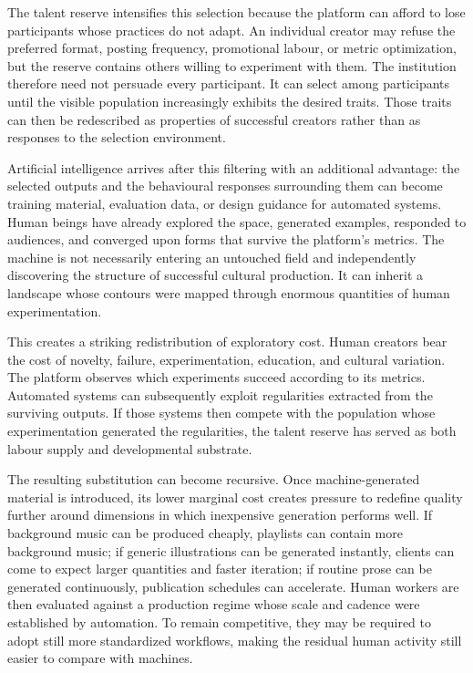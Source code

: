 \documentclass[11pt]{article}
\begin{document}
The talent reserve intensifies this selection because the platform can afford to lose participants whose practices do not adapt. An individual creator may refuse the preferred format, posting frequency, promotional labour, or metric optimization, but the reserve contains others willing to experiment with them. The institution therefore need not persuade every participant. It can select among participants until the visible population increasingly exhibits the desired traits. Those traits can then be redescribed as properties of successful creators rather than as responses to the selection environment.

Artificial intelligence arrives after this filtering with an additional advantage: the selected outputs and the behavioural responses surrounding them can become training material, evaluation data, or design guidance for automated systems. Human beings have already explored the space, generated examples, responded to audiences, and converged upon forms that survive the platform's metrics. The machine is not necessarily entering an untouched field and independently discovering the structure of successful cultural production. It can inherit a landscape whose contours were mapped through enormous quantities of human experimentation.

This creates a striking redistribution of exploratory cost. Human creators bear the cost of novelty, failure, experimentation, education, and cultural variation. The platform observes which experiments succeed according to its metrics. Automated systems can subsequently exploit regularities extracted from the surviving outputs. If those systems then compete with the population whose experimentation generated the regularities, the talent reserve has served as both labour supply and developmental substrate.

The resulting substitution can become recursive. Once machine-generated material is introduced, its lower marginal cost creates pressure to redefine quality further around dimensions in which inexpensive generation performs well. If background music can be produced cheaply, playlists can contain more background music; if generic illustrations can be generated instantly, clients can come to expect larger quantities and faster iteration; if routine prose can be generated continuously, publication schedules can accelerate. Human workers are then evaluated against a production regime whose scale and cadence were established by automation. To remain competitive, they may be required to adopt still more standardized workflows, making the residual human activity still easier to compare with machines.
\end{document}
